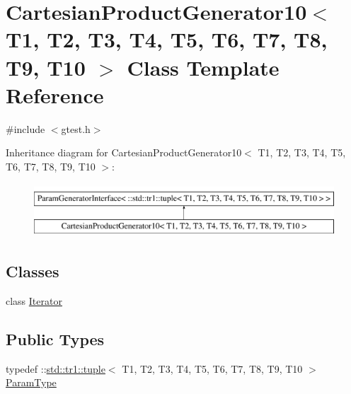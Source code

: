 \hypertarget{classtesting_1_1internal_1_1CartesianProductGenerator10}{\section{\-Cartesian\-Product\-Generator10$<$ \-T1, \-T2, \-T3, \-T4, \-T5, \-T6, \-T7, \-T8, \-T9, \-T10 $>$ \-Class \-Template \-Reference}
\label{d9/df4/classtesting_1_1internal_1_1CartesianProductGenerator10}
}


{\ttfamily \#include $<$gtest.\-h$>$}

\-Inheritance diagram for \-Cartesian\-Product\-Generator10$<$ \-T1, \-T2, \-T3, \-T4, \-T5, \-T6, \-T7, \-T8, \-T9, \-T10 $>$\-:\begin{figure}[H]
\begin{center}
\leavevmode
\includegraphics[height=2.000000cm]{d9/df4/classtesting_1_1internal_1_1CartesianProductGenerator10}
\end{center}
\end{figure}
\subsection*{\-Classes}
\begin{DoxyCompactItemize}
\item 
class \hyperlink{classtesting_1_1internal_1_1CartesianProductGenerator10_1_1Iterator}{\-Iterator}
\end{DoxyCompactItemize}
\subsection*{\-Public \-Types}
\begin{DoxyCompactItemize}
\item 
typedef \-::\hyperlink{classstd_1_1tr1_1_1tuple}{std\-::tr1\-::tuple}$<$ \-T1, \*
\-T2, \-T3, \-T4, \-T5, \-T6, \-T7, \-T8, \-T9, \*
\-T10 $>$ \hyperlink{classtesting_1_1internal_1_1CartesianProductGenerator10_adffde37eb66ea6d9917ab9fd24b46926}{\-Param\-Type}
\end{DoxyCompactItemize}
